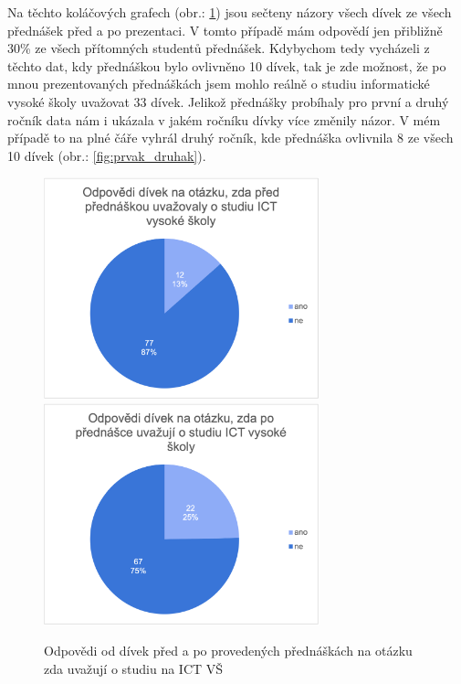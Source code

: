 \documentclass[12pt]{report}			%
\begin{document}
                Na těchto koláčových grafech (obr.: \ref{fig:divky}) jsou sečteny názory všech dívek ze všech přednášek před a po prezentaci. V tomto případě mám odpovědí jen přibližně 30\% ze všech přítomných studentů přednášek. Kdybychom tedy vycházeli z těchto dat, kdy přednáškou bylo ovlivněno 10 dívek, tak je zde možnost, že po mnou prezentovaných přednáškách jsem mohlo reálně o studiu informatické vysoké školy uvažovat 33 dívek. 
                 Jelikož přednášky probíhaly pro první a druhý ročník data nám i ukázala v jakém ročníku dívky více změnily názor. V mém případě to na plné čáře vyhrál druhý ročník, kde přednáška ovlivnila 8 ze všech 10 dívek (obr.: \ref{fig:prvak_druhak}). 
                \begin{figure}
                    \centering
                    \includegraphics[width=8cm]{Maturitni Prace/images/divky_pred.png} 
                    \includegraphics[width=8cm]{Maturitni Prace/images/divky_po.png} 
                    \caption{Odpovědi od dívek před a po provedených přednáškách na otázku zda uvažují o studiu na ICT VŠ}
                    \label{fig:divky}
                \end{figure}  
                
\end{document}
